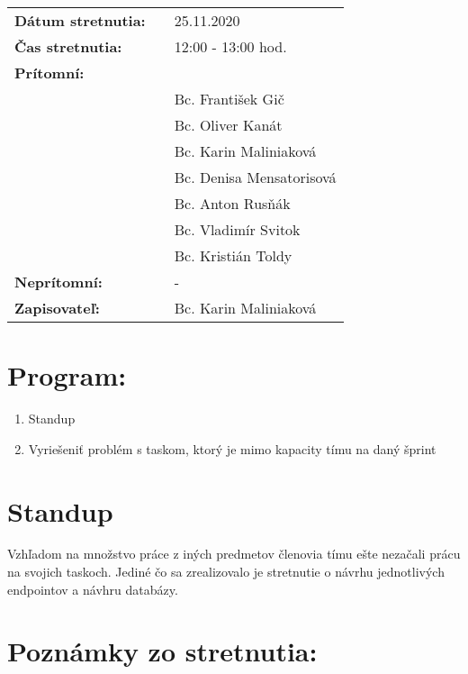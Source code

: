 \documentclass{article}
\begin{document}
    

    \begin{table}[h]
        \begin{tabular}{lllll}
            \multicolumn{3}{l}{\textbf{Dátum stretnutia:}} & & 25.11.2020 \\
            \multicolumn{3}{l}{\textbf{Čas stretnutia:}} & & 12:00 - 13:00 hod. \\
            \multicolumn{3}{l}{\textbf{Prítomní:}} \\
            & & & & Bc. František Gič  \\
            & & & & Bc. Oliver Kanát \\
            & & & & Bc. Karin Maliniaková \\
            & & & & Bc. Denisa Mensatorisová \\
            & & & & Bc. Anton Rusňák \\
            & & & & Bc. Vladimír Svitok \\
            & & & & Bc. Kristián Toldy \\
            \multicolumn{3}{l}{\textbf{Neprítomní:}} & & -\\
            \multicolumn{3}{l}{\textbf{Zapisovateľ:}} & & Bc. Karin Maliniaková \\
        \end{tabular}
        \label{tab:grades}
    \end{table}

    \section*{Program:}

    \begin{enumerate}
        \item Standup
        \item Vyriešeniť problém s taskom, ktorý je mimo kapacity tímu na daný šprint 
    \end{enumerate}

    \section*{Standup}

    \textnormal {Vzhľadom na množstvo práce z iných predmetov členovia tímu ešte nezačali prácu na svojich taskoch. Jediné čo sa zrealizovalo je stretnutie o návrhu jednotlivých endpointov a návhru databázy.}   

    \section*{Poznámky zo stretnutia:}
\end{document}
